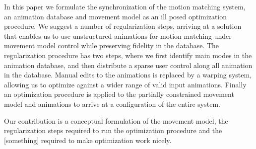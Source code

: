 In this paper we formulate the synchronization of the motion matching system, an animation database and movement model as an ill posed optimization procedure. We suggest a number of regularization steps, arriving at a solution that enables us to use unstructured animations for motion matching under movement model control while preserving fidelity in the database. The regularization procedure has two steps, where we first identify main modes in the animation database, and then distribute a sparse user control along all animation in the database. Manual edits to the animations is replaced by a warping system, allowing us to optimize against a wider range of valid input animations. Finally an optimization procedure is applied to the partially constrained movement model and animations to arrive at a configuration of the entire system.   

Our contribution is a conceptual formulation of the movement model, the regularization steps required to run the optimization procedure and the [something] required to make optimization work nicely.
